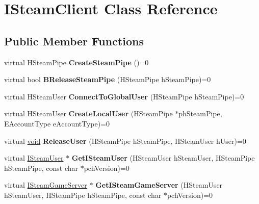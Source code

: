 \hypertarget{classISteamClient}{}\section{I\+Steam\+Client Class Reference}
\label{classISteamClient}
\subsection*{Public Member Functions}
\begin{DoxyCompactItemize}
\item 
\hypertarget{classISteamClient_af1a132da5595a07c840d0d9bb64fd1d0}{}virtual H\+Steam\+Pipe {\bfseries Create\+Steam\+Pipe} ()=0\label{classISteamClient_af1a132da5595a07c840d0d9bb64fd1d0}

\item 
\hypertarget{classISteamClient_a0e01d600680fc53fc8d853abb2e5127c}{}virtual bool {\bfseries B\+Release\+Steam\+Pipe} (H\+Steam\+Pipe h\+Steam\+Pipe)=0\label{classISteamClient_a0e01d600680fc53fc8d853abb2e5127c}

\item 
\hypertarget{classISteamClient_a0555d20dc6895a73e4720f9cc600785a}{}virtual H\+Steam\+User {\bfseries Connect\+To\+Global\+User} (H\+Steam\+Pipe h\+Steam\+Pipe)=0\label{classISteamClient_a0555d20dc6895a73e4720f9cc600785a}

\item 
\hypertarget{classISteamClient_a193afd8a8935c529fc858f915501e4ea}{}virtual H\+Steam\+User {\bfseries Create\+Local\+User} (H\+Steam\+Pipe $\ast$ph\+Steam\+Pipe, E\+Account\+Type e\+Account\+Type)=0\label{classISteamClient_a193afd8a8935c529fc858f915501e4ea}

\item 
\hypertarget{classISteamClient_a2b7b04158cd24d62c20c90cb6a15012e}{}virtual \hyperlink{SDL__audio_8h_a52835ae37c4bb905b903cbaf5d04b05f}{void} {\bfseries Release\+User} (H\+Steam\+Pipe h\+Steam\+Pipe, H\+Steam\+User h\+User)=0\label{classISteamClient_a2b7b04158cd24d62c20c90cb6a15012e}

\item 
\hypertarget{classISteamClient_acb544ee18aa49b7437a0ab41d5daa172}{}virtual \hyperlink{classISteamUser}{I\+Steam\+User} $\ast$ {\bfseries Get\+I\+Steam\+User} (H\+Steam\+User h\+Steam\+User, H\+Steam\+Pipe h\+Steam\+Pipe, const char $\ast$pch\+Version)=0\label{classISteamClient_acb544ee18aa49b7437a0ab41d5daa172}

\item 
\hypertarget{classISteamClient_a2bbffcddb8783778ab163d0c1f382d68}{}virtual \hyperlink{classISteamGameServer}{I\+Steam\+Game\+Server} $\ast$ {\bfseries Get\+I\+Steam\+Game\+Server} (H\+Steam\+User h\+Steam\+User, H\+Steam\+Pipe h\+Steam\+Pipe, const char $\ast$pch\+Version)=0\label{classISteamClient_a2bbffcddb8783778ab163d0c1f382d68}


\end{DoxyCompactItemize}
